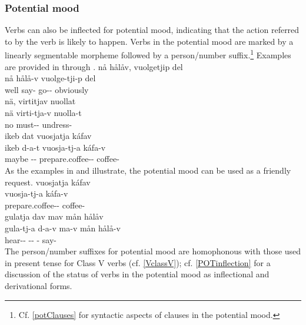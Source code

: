 \subsubsection{Potential mood}\label{POTmood}
Verbs can also be inflected for potential mood, indicating that the action referred to by the verb is likely to happen. Verbs in the potential mood are marked by a linearly segmentable morpheme  followed by a person/number suffix.\footnote{Cf. \SEC\ref{potClauses} for syntactic aspects of clauses in the potential mood.} 
Examples are provided in  through .
\ea\label{potentialEx1}
\glll	nå hålåv, vuolgetjip del\\
	nå hålå-v vuolge-tji-p del\\
	well say- go-- obviously\\\nopagebreak
{}	
\z
\ea\label{potentialEx2}
\glll	nä, virtitjav nuollat\\
	nä virti-tja-v nuolla-t\\
	no must-- undress-\\\nopagebreak
{}	
\z
\ea\label{potentialEx3}
\glll	ikeb dat vuosjatja káfav\\
	ikeb d-a-t vuosja-tj-a káfa-v\\
	maybe -- prepare.coffee-- coffee-\\\nopagebreak
{}	
\z
As the examples in  and  illustrate, the potential mood can be used as a friendly request. 
\ea\label{potentialEx4}%
\glll	vuosjatja káfav\\
	vuosja-tj-a káfa-v\\
	prepare.coffee-- coffee-\\\nopagebreak
{}	
\z
\ea\label{potentialEx5}%
\glll	gulatja dav mav mån hålåv\\
	gula-tj-a d-a-v ma-v mån hålå-v\\
	hear-- -- -  say-\\\nopagebreak
{}	
\z
The person/number suffixes for potential mood are homophonous %
with those used in present tense for Class V verbs (cf. \SEC\ref{VclassV}); cf. \SEC\ref{POTinflection} for a discussion of the status of verbs in the potential mood as inflectional and derivational forms. 


